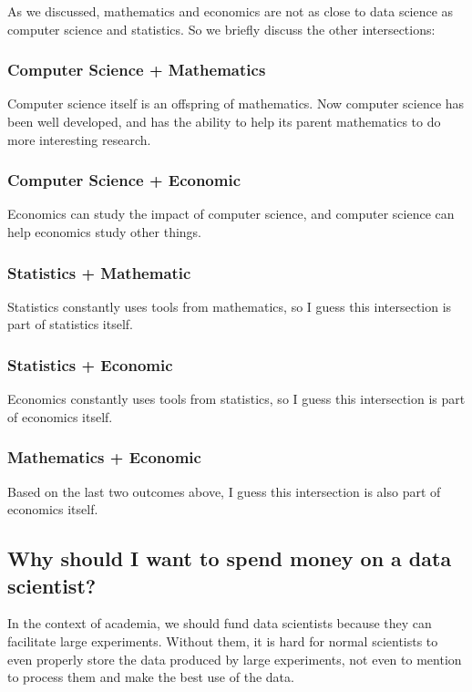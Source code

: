 As we discussed, mathematics and economics are not as close to data science as computer science and statistics.
So we briefly discuss the other intersections:

\subsubsection*{Computer Science + Mathematics}

Computer science itself is an offspring of mathematics.
Now computer science has been well developed, and has the ability to help its parent mathematics to do more interesting research.

\subsubsection*{Computer Science + Economic}

Economics can study the impact of computer science, and computer science can help economics study other things.

\subsubsection*{Statistics + Mathematic}

Statistics constantly uses tools from mathematics, so I guess this intersection is part of statistics itself.

\subsubsection*{Statistics + Economic}

Economics constantly uses tools from statistics, so I guess this intersection is part of economics itself.

\subsubsection*{Mathematics + Economic}

Based on the last two outcomes above, I guess this intersection is also part of economics itself.

\newpage
\subsection*{Why should I want to spend money on a data scientist?}

In the context of academia, we should fund data scientists because they can facilitate large experiments.
Without them, it is hard for normal scientists to even properly store the data produced by large experiments, not even to mention to process them and make the best use of the data.

